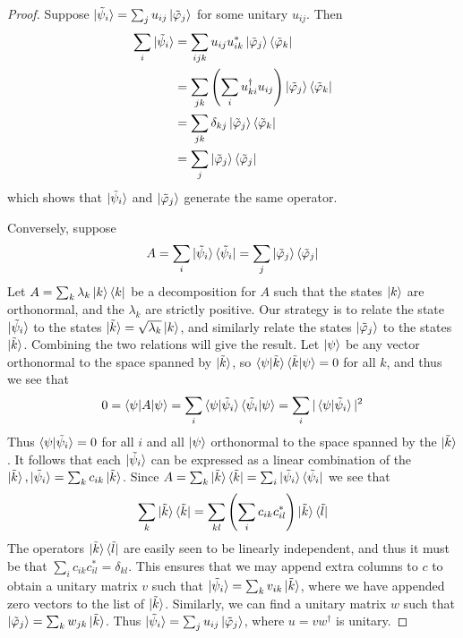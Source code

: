\documentclass[12pt, oneside]{book}
\theoremstyle{definition}
\theoremstyle{definition}
\theoremstyle{remark}
\begin{document}
\begin{proof}
    Suppose $\ket{\tilde{\psi}_i}=\sum_j u_{ij}\ket{\tilde{\varphi}_j}$ for some unitary $u_{ij}$. Then
    \begin{align*}
        \sum_i\ket{\tilde{\psi}_i}&=\sum_{ijk} u_{ij}u_{ik}^* \ket{\tilde{\varphi}_j}\bra{\tilde{\varphi}_k}\\
        &=\sum_{jk}\left(\sum_iu_{ki}^{\dagger}u_{ij}\right) \ket{\tilde{\varphi}_j}\bra{\tilde{\varphi}_k}\\
        &=\sum_{jk}\delta_{kj} \ket{\tilde{\varphi}_j}\bra{\tilde{\varphi}_k}\\
        &=\sum_j \ket{\tilde{\varphi}_j}\bra{\tilde{\varphi}_j}
    \end{align*}
    which shows that $\ket{\tilde{\psi}_i}$ and $\ket{\tilde{\varphi}_j}$ generate the same operator.

    Conversely, suppose
    \[
    A=\sum_i \ket{\tilde{\psi}_i}\bra{\tilde{\psi}_i}=\sum_j\ket{\tilde{\varphi}_j}\bra{\tilde{\varphi}_j}
    \]
    Let $A=\sum_k\lambda_k\ket{k}\bra{k}$ be a decomposition for $A$ such that the states $\ket{k}$ are orthonormal, and the $\lambda_k$ are strictly positive. Our strategy is to relate the state $\ket{\tilde{\psi}_i}$ to the states $\ket{\tilde{k}}=\sqrt{\lambda_k}\ket{k}$, and similarly relate the states $\ket{\tilde{\varphi}_j}$ to the states $\ket{\tilde{k}}$. Combining the two relations will give the result. Let $\ket{\psi}$ be any vector orthonormal to the space spanned by $\ket{\tilde{k}}$, so $\braket{\psi|\tilde{k}}\braket{\tilde{k}|\psi}=0$ for all $k$, and thus we see that
    \[
    0=\braket{\psi|A|\psi}=\sum_i\braket{\psi|\tilde{\psi}_i}\braket{\tilde{\psi_i}|\psi}=\sum_i|\braket{\psi|\tilde{\psi}_i}|^2
    \]
    Thus $\braket{\psi|\tilde{\psi}_i}=0$ for all $i$ and all $\ket{\psi}$ orthonormal to the space spanned by the $\ket{\tilde{k}}$. It follows that each $\ket{\tilde{\psi}_i}$ can be expressed as a linear combination of the $\ket{\tilde{k}},\ket{\tilde{\psi}_i}=\sum_kc_{ik}\ket{\tilde{k}}$. Since $A=\sum_k\ket{\tilde{k}}\bra{\tilde{k}}=\sum_i\ket{\tilde{\psi}_i}\bra{\tilde{\psi}_i}$ we see that
    \[
    \sum_k \ket{\tilde{k}}\bra{\tilde{k}}=\sum_{kl}\left(\sum_i c_{ik}c_{il}^*\right) \ket{\tilde{k}}\bra{\tilde{l}}
    \]
    The operators $\ket{\tilde{k}}\bra{\tilde{l}}$ are easily seen to be linearly independent, and thus it must be that $\sum_i c_{ik}c_{il}^*=\delta_{kl}$. This ensures that we may append extra columns to $c$ to obtain a unitary matrix $v$ such that $\ket{\tilde{\psi}_i}=\sum_kv_{ik}\ket{\tilde{k}}$, where we have appended zero vectors to the list of $\ket{\tilde{k}}$. Similarly, we can find a unitary matrix $w$ such that $\ket{\tilde{\varphi}_j}=\sum_k w_{jk}\ket{\tilde{k}}$. Thus $\ket{\tilde{\psi}_i} = \sum_ju_{ij}\ket{\tilde{\varphi}_j}$, where $u=vw^{\dagger}$ is unitary.
\end{proof}
\end{document}
